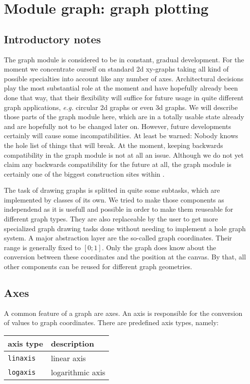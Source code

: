 \chapter{Module graph: graph plotting}
\label{graph}
\section{Introductory notes}

The graph module is considered to be in constant, gradual development.
For the moment we concentrate ourself on standard 2d xy-graphs taking
all kind of possible specialties into account like any number of axes.
Architectural decisions play the most substantial role at the moment
and have hopefully already been done that way, that their flexibility
will suffice for future usage in quite different graph applications,
\emph{e.g.} circular 2d graphs or even 3d graphs. We will describe
those parts of the graph module here, which are in a totally usable
state already and are hopefully not to be changed later on. However,
future developments certainly will cause some incompatibilities. At
least be warned: Nobody knows the hole list of things that will break.
At the moment, keeping backwards compatibility in the graph module is
not at all an issue. Although we do not yet claim any backwards
compatibility for the future at all, the graph module is certainly one
of the biggest construction sites within \PyX.

The task of drawing graphs is splitted in quite some subtasks, which
are implemented by classes of its own. We tried to make those
components as independend as it is usefull and possible in order to
make them reuseable for different graph types. They are also
replaceable by the user to get more specialized graph drawing tasks
done without needing to implement a hole graph system. A major
abstraction layer are the so-called graph coordinates. Their range is
generally fixed to $[0;1]$. Only the graph does know about the
conversion between these coordinates and the position at the canvas.
By that, all other components can be reused for different graph
geometries.

\section{Axes}
\label{graph:axes}

A common feature of a graph are axes. An axis is responsible for the
conversion of values to graph coordinates. There are predefined axis
types, namely:
\begin{center}
\begin{tabular}{ll}
axis type&description\\
\hline
\texttt{linaxis}&linear axis\\
\texttt{logaxis}&logarithmic axis\\
\end{tabular}
\end{center}

